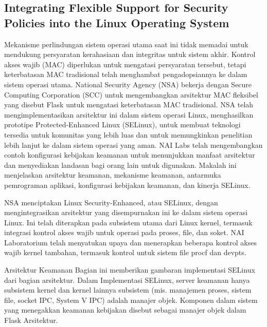 \begin{enumeratae}
\section{Integrating Flexible Support for Security Policies into the Linux Operating System}
Mekanisme perlindungan sistem operasi utama saat ini tidak memadai untuk mendukung persyaratan kerahasiaan dan integritas untuk sistem akhir. Kontrol akses wajib (MAC) diperlukan untuk mengatasi persyaratan tersebut, tetapi keterbatasan MAC tradisional telah menghambat pengadopsiannya ke dalam sistem operasi utama. National Security Agency (NSA) bekerja dengan Secure Computing Corporation (SCC) untuk mengembangkan arsitektur MAC fleksibel yang disebut Flask untuk mengatasi keterbatasan MAC tradisional. NSA telah mengimplementasikan arsitektur ini dalam sistem operasi Linux, menghasilkan prototipe Protected-Enhanced Linux (SELinux), untuk membuat teknologi tersedia untuk komunitas yang lebih luas dan untuk memungkinkan penelitian lebih lanjut ke dalam sistem operasi yang aman. NAI Labs telah mengembangkan contoh konfigurasi kebijakan keamanan untuk menunjukkan manfaat arsitektur dan menyediakan landasan bagi orang lain untuk digunakan. Makalah ini menjelaskan arsitektur keamanan, mekanisme keamanan, antarmuka pemrograman aplikasi, konfigurasi kebijakan keamanan, dan kinerja SELinux.

NSA menciptakan Linux Security-Enhanced, atau SELinux, dengan mengintegrasikan arsitektur yang disempurnakan ini ke dalam sistem operasi Linux. Ini telah diterapkan pada subsistem utama dari Linux kernel, termasuk integrasi kontrol akses wajib untuk operasi pada proses, file, dan soket. NAI Laboratorium telah menyatukan upaya dan menerapkan beberapa kontrol akses wajib kernel tambahan, termasuk kontrol untuk sistem file procf dan devpts.

Arsitektur Keamanan
Bagian ini memberikan gambaran implementasi SELinux dari bagian arsitektur. Dalam Implementasi SELinux, server keamanan hanya subsistem kernel dan kernel lainnya subsistem (mis. manajemen proses, sistem file, socket IPC, System V IPC) adalah manajer objek. Komponen dalam sistem yang menegakkan keamanan kebijakan disebut sebagai manajer objek dalam Flask Arsitektur.



\end{enumeratae}
